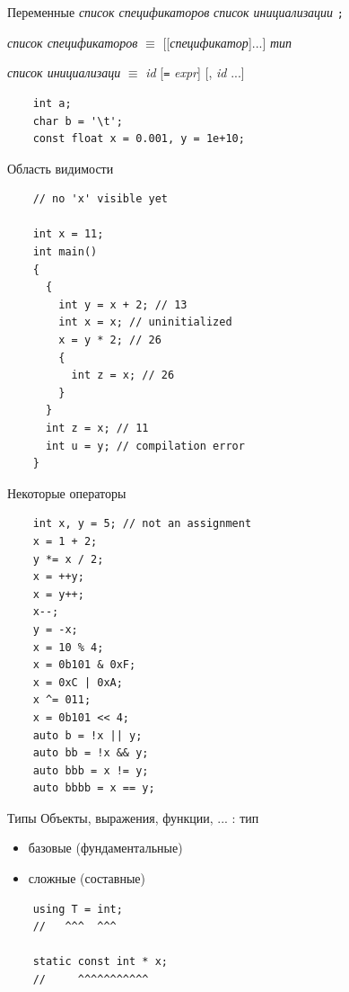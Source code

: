 \documentclass[unknownkeysallowed,xcolor=table]{beamer}
\begin{document}
\begin{frame}[fragile]{Переменные}
  \emph{список спецификаторов} \emph{список инициализации} \lstinline{;}

  \vspace{1em}

  \emph{список спецификаторов} $\equiv$ [[\emph{спецификатор}]...] \emph{тип}

  \vspace{1em}

  \emph{список инициализаци} $\equiv$ \emph{id} [\lstinline{=} \emph{expr}] [, \emph{id} ...]

  \vspace{1em}

  \begin{lstlisting}
    int a;
    char b = '\t';
    const float x = 0.001, y = 1e+10;
  \end{lstlisting}
\end{frame}

\begin{frame}[fragile]{Область видимости}
  \begin{lstlisting}
    // no 'x' visible yet

    int x = 11;
    int main()
    {
      {
        int y = x + 2; // 13
        int x = x; // uninitialized
        x = y * 2; // 26
        {
          int z = x; // 26
        }
      }
      int z = x; // 11
      int u = y; // compilation error
    }
  \end{lstlisting}
\end{frame}

\begin{frame}[fragile]{Некоторые операторы}
  \begin{lstlisting}
    int x, y = 5; // not an assignment
    x = 1 + 2;
    y *= x / 2;
    x = ++y;
    x = y++;
    x--;
    y = -x;
    x = 10 % 4;
    x = 0b101 & 0xF;
    x = 0xC | 0xA;
    x ^= 011;
    x = 0b101 << 4;
    auto b = !x || y;
    auto bb = !x && y;
    auto bbb = x != y;
    auto bbbb = x == y;
  \end{lstlisting}
\end{frame}

\begin{frame}{Типы}
  Объекты, выражения, функции, ... : тип

  \vspace{2em}

  \begin{itemize}
    \item базовые (фундаментальные) \vspace{1em}
    \item сложные (составные)
  \end{itemize}
  \vspace{1em}
  \begin{lstlisting}
    using T = int;
    //   ^^^  ^^^

    static const int * x;
    //     ^^^^^^^^^^^
  \end{lstlisting}
\end{frame}
\end{document}

